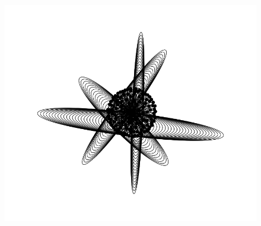 \documentclass[11pt]{article}
\begin{document}
\begin{figure}[htp]
\centering
\includegraphics[scale=0.6]{1363498617__knowladge-reaktor.png}
\caption{}
\label{}
\end{figure}
\end{document}
